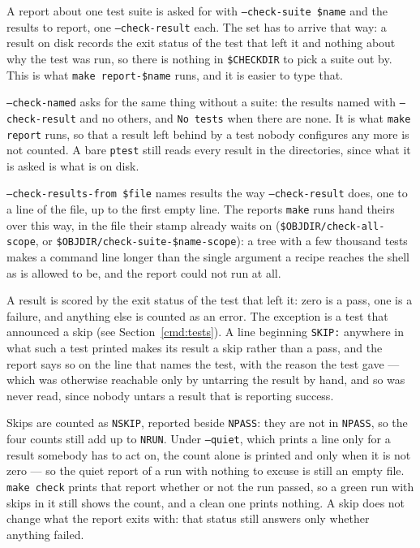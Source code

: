 \documentclass{article}
\begin{document}
A report about one test suite is asked for with
\texttt{--check-suite \$name} and the results to report, one
\texttt{--check-result} each.  The set has to arrive that way: a
result on disk records the exit status of the test that left it and
nothing about why the test was run, so there is nothing in
\texttt{\$CHECKDIR} to pick a suite out by.  This is what
\texttt{make report-\$name} runs, and it is easier to type that.

\texttt{--check-named} asks for the same thing without a suite: the
results named with \texttt{--check-result} and no others, and
\texttt{No tests} when there are none.  It is what \texttt{make report}
runs, so that a result left behind by a test nobody configures any more
is not counted.  A bare \texttt{ptest} still reads every result in the
directories, since what it is asked is what is on disk.

\texttt{--check-results-from \$file} names results the way
\texttt{--check-result} does, one to a line of the file, up to the
first empty line.  The reports \texttt{make} runs hand theirs over this
way, in the file their stamp already waits on
(\texttt{\$OBJDIR/check-all-scope}, or
\texttt{\$OBJDIR/check-suite-\$name-scope}): a tree with a few thousand
tests makes a command line longer than the single argument a recipe
reaches the shell as is allowed to be, and the report could not run at
all.

A result is scored by the exit status of the test that left it: zero
is a pass, one is a failure, and anything else is counted as an error.
The exception is a test that announced a skip (see
Section~\ref{cmd:tests}).  A line beginning \texttt{SKIP:} anywhere in
what such a test printed makes its result a skip rather than a pass,
and the report says so on the line that names the test, with the
reason the test gave --- which was otherwise reachable only by
untarring the result by hand, and so was never read, since nobody
untars a result that is reporting success.

Skips are counted as \texttt{NSKIP}, reported beside \texttt{NPASS}:
they are not in \texttt{NPASS}, so the four counts still add up to
\texttt{NRUN}.  Under \texttt{--quiet}, which prints a line only for a
result somebody has to act on, the count alone is printed and only
when it is not zero --- so the quiet report of a run with nothing to
excuse is still an empty file.  \texttt{make check} prints that
report whether or not the run passed, so a green run with skips in it
still shows the count, and a clean one prints nothing.  A skip does
not change what the report exits with: that status still answers only whether anything failed.
\end{document}

